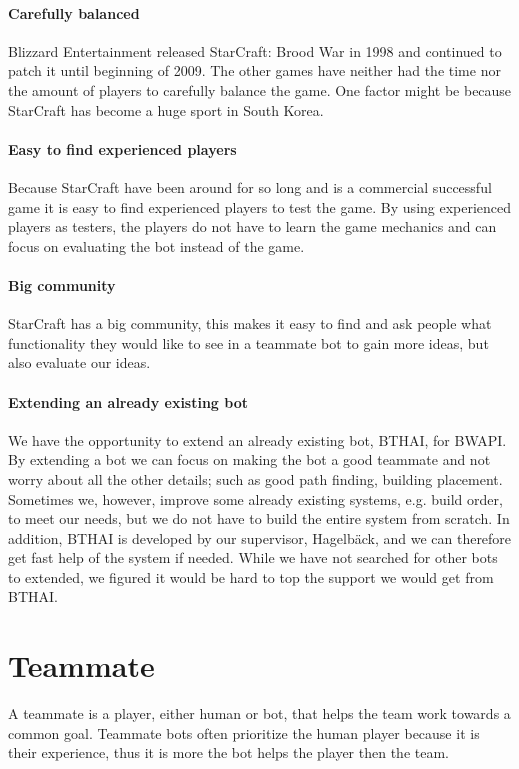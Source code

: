 \paragraph{Carefully balanced}
Blizzard Entertainment released StarCraft: Brood War in 1998 and continued to patch it until beginning of 2009.
The other games have neither had the time nor the amount of players to carefully balance the game. One factor might be because StarCraft has become a huge sport in South Korea\cite{scKotakuKorea}.

\paragraph{Easy to find experienced players}
Because StarCraft have been around for so long and is a commercial successful game it is easy to find experienced players to test the game. By using experienced players as testers, the players do not have to learn the game mechanics and can focus on evaluating the bot instead of the game.

\paragraph{Big community}
StarCraft has a big community, this makes it easy to find and ask people what functionality they would like to see in a teammate bot to gain more ideas, but also evaluate our ideas.

\paragraph{Extending an already existing bot} We have the opportunity to extend an already existing bot, BTHAI\cite{bthai}, for BWAPI\cite{bwapi}. By extending a bot we can focus on making the bot a good teammate and not worry about all the other details; such as good path finding, building placement. Sometimes we, however, improve some already existing systems, e.g. build order, to meet our needs, but we do not have to build the entire system from scratch. In addition, BTHAI is developed by our supervisor, Hagelbäck, and we can therefore get fast help of the system if needed. While we have not searched for other bots to extended, we figured it would be hard to top the support we would get from BTHAI.

\section{Teammate}
A teammate is a player, either human or bot, that helps the team work towards a common goal. Teammate bots often prioritize the human player because it is their experience, thus it is more the bot helps the player then the team.


